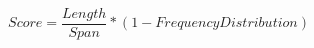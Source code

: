 
\begin{equation} \label{eq:score}
Score = \frac{Length}{Span} * (1 - Frequency Distribution)
\end{equation}



